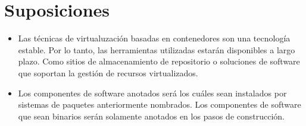 \section{Suposiciones}

\begin{itemize}
	\item Las técnicas de virtualuzación basadas en contenedores son una tecnología estable. Por lo tanto, las herramientas utilizadas estarán disponibles a largo plazo. Como sitios de almacenamiento de repositorio o soluciones de software que soportan la gestión de recursos virtualizados.
	\item Los componentes de software anotados será los cuáles sean instalados por sistemas de paquetes anteriormente nombrados. Los componentes de software que sean binarios serán solamente anotados en los pasos de construcción. 
\end{itemize}